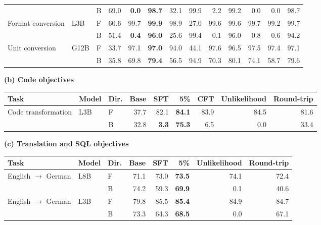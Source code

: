 \begin{table}[!t]
\begin{tabular}{lllrrrrrrrrrr}
 &  & B & 69.0 & \textcolor{red!70!black}{\textbf{0.0}} & \textcolor{blue!60!black}{\textbf{98.7}} & 32.1 & 99.9 & 2.2 & 99.2 & 0.0 & 0.0 & 98.7 \\
\addlinespace[2pt]
Format conversion & L3B & F & 60.6 & 99.7 & \textcolor{blue!60!black}{\textbf{99.9}} & 98.9 & 27.0 & 99.6 & 99.6 & 99.7 & 99.2 & 99.7 \\
 &  & B & 51.4 & \textcolor{red!70!black}{\textbf{0.4}} & \textcolor{blue!60!black}{\textbf{96.0}} & 25.6 & 99.4 & 0.1 & 96.0 & 0.8 & 0.6 & 94.2 \\
\addlinespace[2pt]
Unit conversion & G12B & F & 33.7 & 97.1 & \textcolor{blue!60!black}{\textbf{97.0}} & 94.0 & 44.1 & 97.6 & 96.5 & 97.5 & 97.4 & 97.1 \\
 &  & B & 35.8 & 69.8 & \textcolor{blue!60!black}{\textbf{79.4}} & 56.5 & 94.9 & 70.3 & 80.1 & 74.1 & 58.7 & 79.6 \\
\bottomrule
\end{tabular}
\par\medskip\textbf{(b) Code objectives}\par\smallskip
\setlength{\tabcolsep}{3pt}
\begin{tabular}{lllrrrrrr}
\toprule
Task & Model & Dir. & Base & SFT & 5\% & CFT & Unlikelihood & Round-trip \\
\midrule
Code transformation & L3B & F & 37.7 & 82.1 & \textcolor{blue!60!black}{\textbf{84.1}} & 83.9 & 84.5 & 81.6 \\
 &  & B & 32.8 & \textcolor{red!70!black}{\textbf{3.3}} & \textcolor{blue!60!black}{\textbf{75.3}} & 6.5 & 0.0 & 33.4 \\
\bottomrule
\end{tabular}
\par\medskip\textbf{(c) Translation and SQL objectives}\par\smallskip
\setlength{\tabcolsep}{3pt}
\begin{tabular}{lllrrrrr}
\toprule
Task & Model & Dir. & Base & SFT & 5\% & Unlikelihood & Round-trip \\
\midrule
English $\to$ German & L8B & F & 71.1 & 73.0 & \textcolor{blue!60!black}{\textbf{73.5}} & 74.1 & 72.4 \\
 &  & B & 74.2 & 59.3 & \textcolor{blue!60!black}{\textbf{69.9}} & 0.1 & 40.6 \\
\addlinespace[2pt]
English $\to$ German & L3B & F & 79.8 & 85.5 & \textcolor{blue!60!black}{\textbf{85.4}} & 84.9 & 84.7 \\
 &  & B & 73.3 & 64.3 & \textcolor{blue!60!black}{\textbf{68.5}} & 0.0 & 67.1 \\

\end{tabular}
\end{table}

